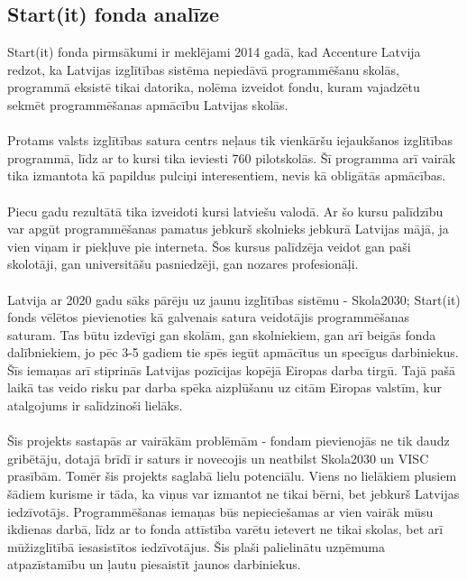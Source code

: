 \subsection{Start(it) fonda analīze}
Start(it) fonda pirmsākumi ir meklējami 2014 gadā, kad Accenture Latvija redzot, ka Latvijas izglītības
sistēma nepiedāvā programmēšanu skolās, programmā eksistē tikai datorika, nolēma izveidot fondu, kuram
vajadzētu sekmēt programmēšanas apmācību Latvijas skolās.
\paragraph{}
Protams valsts izglītības satura centrs neļaus tik vienkāršu iejaukšanos izglītības programmā, līdz ar
to kursi tika ieviesti 760 pilotskolās. Šī programma arī vairāk tika izmantota kā papildus pulciņi 
interesentiem, nevis kā obligātās apmācības.
\paragraph{}
Piecu gadu rezultātā tika izveidoti kursi latviešu valodā. Ar šo kursu palīdzību var apgūt programmēšanas pamatus
jebkurš skolnieks jebkurā Latvijas mājā, ja vien viņam ir piekļuve pie interneta. Šos kursus palīdzēja
veidot gan paši skolotāji, gan universitāšu pasniedzēji, gan nozares profesionāļi.
\paragraph{}
Latvija ar 2020 gadu sāks pārēju uz jaunu izglītības sistēmu - Skola2030; Start(it) fonds vēlētos pievienoties
kā galvenais satura veidotājis programmēšanas saturam. Tas būtu izdevīgi gan skolām, gan skolniekiem,
gan arī beigās fonda dalībniekiem, jo pēc 3-5 gadiem tie spēs iegūt apmācītus un specīgus darbiniekus.
Šīs iemaņas arī stiprinās Latvijas pozīcijas kopējā Eiropas darba tirgū. Tajā pašā laikā tas veido risku
par darba spēka aizplūšanu uz citām Eiropas valstīm, kur atalgojums ir salīdzinoši lielāks.
\paragraph{}
Šis projekts sastapās ar vairākām problēmām - fondam pievienojās ne tik daudz gribētāju, dotajā brīdī
ir saturs ir novecojis un neatbilst Skola2030 un VISC prasībām. Tomēr šis projekts saglabā lielu potenciālu.
Viens no lielākiem plusiem šādiem kurisme ir tāda, ka viņus var izmantot ne tikai bērni, bet jebkurš Latvijas
iedzīvotājs. Programmēšanas iemaņas būs nepieciešamas ar vien vairāk mūsu ikdienas darbā, līdz ar to fonda
attīstība varētu ietevert ne tikai skolas, bet arī mūžizglītībā iesasistītos iedzīvotājus. Šis plaši palielinātu
uzņēmuma atpazīstamību un ļautu piesaistīt jaunos darbiniekus.
